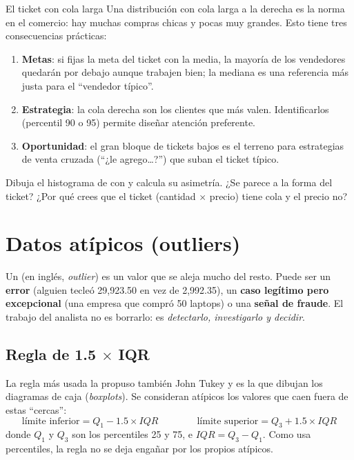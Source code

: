 \begin{negocio}{El ticket con cola larga}
Una distribución con cola larga a la derecha es la norma en el comercio: hay
muchas compras chicas y pocas muy grandes. Esto tiene tres consecuencias
prácticas:
\begin{enumerate}
  \item \textbf{Metas}: si fijas la meta del ticket con la media, la mayoría
        de los vendedores quedarán por debajo aunque trabajen bien; la mediana
        es una referencia más justa para el ``vendedor típico''.
  \item \textbf{Estrategia}: la cola derecha son los clientes que más valen.
        Identificarlos (percentil 90 o 95) permite diseñar atención
        preferente.
  \item \textbf{Oportunidad}: el gran bloque de tickets bajos es el terreno
        para estrategias de venta cruzada (``¿le agrego\ldots?'') que suban el
        ticket típico.
\end{enumerate}
\end{negocio}

\begin{hazlotu}
Dibuja el histograma de  con  y
calcula su asimetría. ¿Se parece a la forma del ticket? ¿Por qué crees que el
ticket (cantidad $\times$ precio) tiene cola y el precio no?
\end{hazlotu}

\section{Datos atípicos (outliers)}
\label{sec:m4-atipicos}

Un  (en inglés, \emph{outlier}) es un valor que se
aleja mucho del resto. Puede ser un \textbf{error} (alguien tecleó 29,923.50
en vez de 2,992.35), un \textbf{caso legítimo pero excepcional} (una empresa
que compró 50 laptops) o una \textbf{señal de fraude}. El trabajo del analista
no es borrarlo: es \emph{detectarlo, investigarlo y decidir}.

\subsection{Regla de 1.5 $\times$ IQR}

La regla más usada la propuso también John Tukey y es la que dibujan los
diagramas de caja (\emph{boxplots}). Se consideran atípicos los valores que
caen fuera de estas ``cercas'':
\[
  \text{límite inferior} = Q_1 - 1.5 \times IQR
  \qquad\qquad
  \text{límite superior} = Q_3 + 1.5 \times IQR
\]
donde $Q_1$ y $Q_3$ son los percentiles 25 y 75, e $IQR = Q_3 - Q_1$. Como
usa percentiles, la regla no se deja engañar por los propios atípicos.

